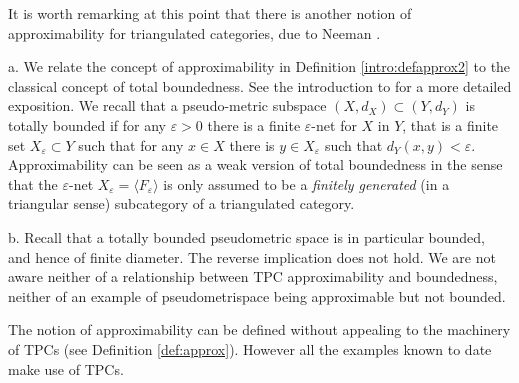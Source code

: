 \begin{remark}
    It is worth remarking at this point that there is another notion of approximability for triangulated categories, due to Neeman \cite{Neeman:approx_tri}.
\end{remark}
\begin{remark}
    a. We relate the concept of approximability in Definition \ref{intro:defapprox2} to the classical concept of total boundedness. See the introduction to \cite{ABC26} for a more detailed exposition. We recall that a pseudo-metric subspace $(X,d_X)\subset (Y,d_Y)$ is totally bounded if for any $\varepsilon>0$ there is a finite $\varepsilon$-net for $X$ in $Y$, that is a finite set $X_\varepsilon\subset Y$ such that for any $x\in X$ there is $y\in X_\varepsilon$ such that $d_Y(x,y)<\varepsilon$. Approximability can be seen as a weak version of total boundedness in the sense that the $\varepsilon$-net $X_\varepsilon = \langle F_\varepsilon \rangle$ is only assumed to be a \textit{finitely generated} (in a triangular sense) subcategory of a triangulated category.

    b. Recall that a totally bounded pseudometric space is in particular bounded, and hence of finite diameter. The reverse implication does not hold. We are not aware neither of a relationship between TPC approximability and boundedness, neither of an example of pseudometrispace being approximable but not bounded.
\end{remark}
\begin{remark}\label{polemics}
    The notion of approximability can be defined without appealing to the machinery of TPCs (see Definition \ref{def:approx}). However all the examples known to date make use of TPCs.
\end{remark}

